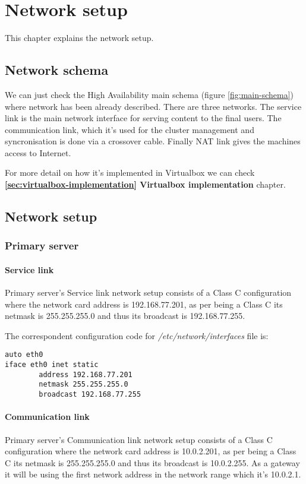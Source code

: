 

\chapter{Network setup}
\label{chap:network-setup}
This chapter explains the network setup.

\section {Network schema}
We can just check the High Availability main schema (figure \ref{fig:main-schema}) where network has been already described. There are three networks. The service link is the main network interface for serving content to the final users. The communication link, which it's used for the cluster management and syncronisation is done via a crossover cable. Finally NAT link gives the machines access to Internet.

For more detail on how it's implemented in Virtualbox we can check \textbf{\ref{sec:virtualbox-implementation} Virtualbox implementation} chapter.

\section {Network setup}

\subsection {Primary server}
\subsubsection {Service link}
Primary server's Service link network setup consists of a Class C configuration where the network card address is 192.168.77.201, as per being a Class C its netmask is 255.255.255.0 and thus its broadcast is 192.168.77.255.

The correspondent configuration code for \textit{/etc/network/interfaces} file is:
\begin{verbatim}
auto eth0
iface eth0 inet static
        address 192.168.77.201
        netmask 255.255.255.0
        broadcast 192.168.77.255
\end{verbatim}

\subsubsection {Communication link}
Primary server's Communication link network setup consists of a Class C configuration where the network card address is 10.0.2.201, as per being a Class C its netmask is 255.255.255.0 and thus its broadcast is 10.0.2.255. As a gateway it will be using the first network address in the network range which it's 10.0.2.1.

